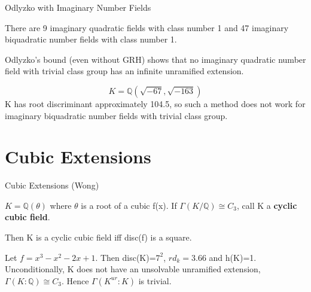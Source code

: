 \documentclass[10pt]{beamer}
\newcommand{\q}{\mathbb{Q}}
\theoremstyle{plain} %
\begin{document}
\begin{frame}{Odlyzko with Imaginary Number Fields}
\pause

    There are 9 imaginary quadratic fields with class number 1 and 47 imaginary biquadratic number fields with class number 1. \par Odlyzko's bound (even without GRH) shows that no imaginary quadratic number field with trivial class group has an infinite unramified extension. 
    \pause

    \begin{example}
          \begin{equation}
        K=\q(\sqrt{-67},\sqrt{-163})
    \end{equation}
    K has root discriminant approximately 104.5, so such a method does not work for imaginary biquadratic number fields with trivial class group.
    \end{example}

\end{frame}
\section{Cubic Extensions}
\begin{frame}{Cubic Extensions (Wong) }
\pause

 $K=\mathbb{Q}(\theta)$ where $\theta$ is a root of a cubic
f(x). If $\Gamma(K/\mathbb{Q}) \cong C_3$, call K a  \textbf{cyclic cubic field}.
\pause

\begin{theorem}
Then K is a cyclic cubic field iff disc(f) is a square. 
\end{theorem}
\pause

\begin{example}
    Let $f=x^3-x^2-2x+1$. Then disc(K)=$7^2$, $rd_{k}=3.66$ and h(K)=1. Unconditionally, K does not have an unsolvable unramified extension, $\Gamma(K:\mathbb{Q})\cong C_3$. Hence $\Gamma(K^{ur}:K) $ is trivial.
\end{example}
\end{frame}
\end{document}
